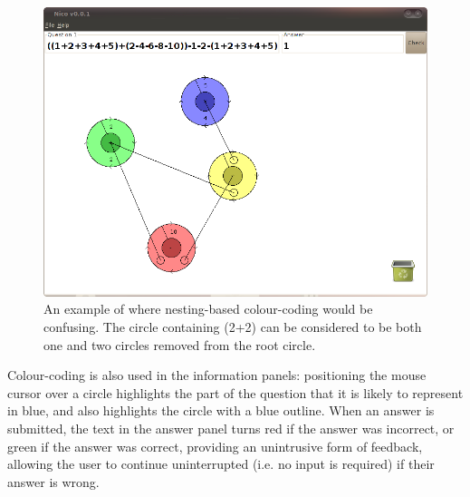 \documentclass[12pt,twoside,notitlepage,xetex]{report}
\begin{document}
\begin{center}
\begin{figure}[H]
\begin{center}
\includegraphics[width=\textwidth-2cm]{figs/nico_screen_02.png}
\end{center}
\caption{An example of where nesting-based colour-coding would be confusing.  The circle containing (2+2) can be considered to be both one and two circles removed from the root circle.}
\label{fig:Nico2}
\end{figure}
\end{center}

Colour-coding is also used in the information panels: positioning the mouse cursor over a circle highlights the part of
the question that it is likely to represent in blue, and also highlights the
circle with a blue outline.  When an answer is submitted, the text in the
answer panel turns red if the answer was incorrect, or green if the answer was
correct, providing an unintrusive form of feedback, allowing the user to
continue uninterrupted (i.e. no input is required) if their answer is wrong.
\end{document}
